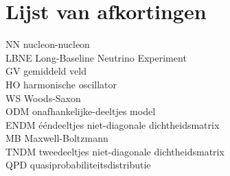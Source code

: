 \documentclass[11pt,twoside]{book}
\begin{document}
\chapter{Lijst van afkortingen}

NN nucleon-nucleon \\
LBNE Long-Baseline Neutrino Experiment \\
GV gemiddeld veld \\
HO harmonische oscillator \\
WS Woods-Saxon \\
ODM onafhankelijke-deeltjes model \\
ENDM \'{e}\'{e}ndeeltjes niet-diagonale dichtheidsmatrix \\
MB Maxwell-Boltzmann \\
TNDM tweedeeltjes niet-diagonale dichtheidsmatrix \\
QPD quasiprobabiliteitsdistributie \\




\newpage




\listoffigures
\listoftables
\end{document}
